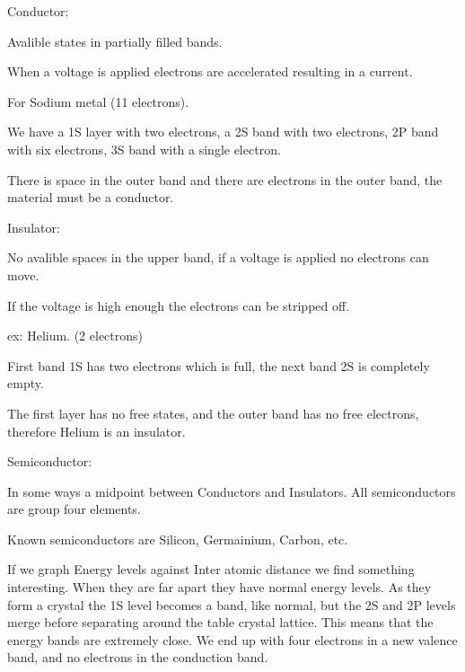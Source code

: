 \documentclass{report}
\begin{document}
\begin{description}
\begin{mdframed}
            Conductor:
            \begin{mdframed}
                Avalible states in partially filled bands.

                When a voltage is applied electrons are
                accelerated resulting in a current.

                For Sodium metal (11 electrons).

                We have a 1S layer with two electrons,
                a 2S band with two electrons,
                2P band with six electrons,
                3S band with a single electron.

                There is space in the outer band and
                there are electrons in the outer band,
                the material must be a conductor.
            \end{mdframed}

            Insulator:
            \begin{mdframed}
                No avalible spaces in the upper band,
                if a voltage is applied no electrons can move.

                If the voltage is high enough the electrons
                can be stripped off.

                ex: Helium. (2 electrons)

                First band 1S has two electrons which is full,
                the next band 2S is completely empty.

                The first layer has no free states, and the
                outer band has no free electrons, therefore
                Helium is an insulator.
            \end{mdframed}
        \end{mdframed}

        \begin{mdframed}
            Semiconductor:
            \begin{mdframed}
                In some ways a midpoint between Conductors
                and Insulators. All semiconductors are group
                four elements.

                Known semiconductors are Silicon, Germainium,
                Carbon, etc.

                If we graph Energy levels against
                Inter atomic distance we find something
                interesting. When they are far apart
                they have normal energy levels. As they
                form a crystal the 1S level becomes a
                band, like normal, but the 2S and 2P
                levels merge before separating around
                the table crystal lattice. This means
                that the energy bands are extremely
                close. We end up with four electrons
                in a new valence band, and no
                electrons in the conduction band.


\end{mdframed}
\end{mdframed}
\end{description}
\end{document}
